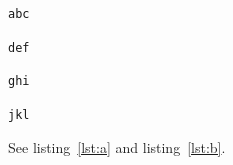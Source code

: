 \documentclass{article}
\begin{document}
\lstlistoflistings

\begin{lstlisting}[caption={A listing},label=lst:a]
abc
\end{lstlisting}

\begin{lstlisting}[title={A title}]
def
\end{lstlisting}

\begin{lstlisting}[float=htbp,caption={A floating listing},label=lst:b]
ghi
\end{lstlisting}

\begin{lstlisting}[float=htbp,title={A floating title}]
jkl
\end{lstlisting}

See listing~\ref{lst:a} and listing~\ref{lst:b}.
\end{document}
